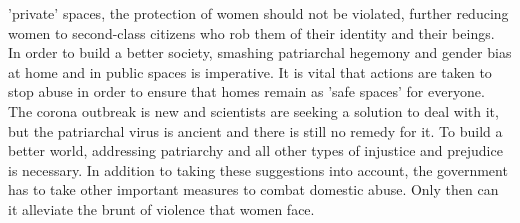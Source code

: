\begin{multicols}{2}
'private' spaces, the protection of women should not be violated, further reducing women to
second-class citizens who rob them of their identity and their beings. In order to build a better
society, smashing patriarchal hegemony and gender bias at home and in public spaces is
imperative. It is vital that actions are taken to stop abuse in order to ensure that homes remain
as 'safe spaces' for everyone. The corona outbreak is new and scientists are seeking a solution
to deal with it, but the patriarchal virus is ancient and there is still no remedy for it. To build a
better world, addressing patriarchy and all other types of injustice and prejudice is necessary.
In addition to taking these suggestions into account, the government has to take other
important measures to combat domestic abuse. Only then can it alleviate the brunt of violence
that women face. 
\end{multicols}
\label{end2021-art7}
